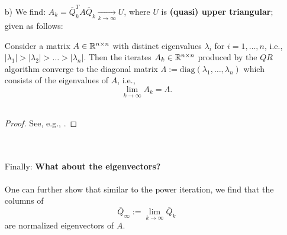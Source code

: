 \begin{frame}
\begin{itemize}
	\item[b)] We find: $A_{k} = \overline{Q}_k^T A\overline{Q}_k  \xrightarrow[k\to \infty]{} U$, where $U$ is {\color{codegreen}\textbf{(quasi) upper triangular}}; given as follows:
\begin{theorem}[$QR$ Algorithm]
Consider a matrix $A\in{\mathbb{R}}^{n\times n}$ with distinct eigenvalues $\lambda_i$ for $i=1,\ldots,n$, i.e.,
$
|\lambda_1|>|\lambda_2|>\ldots>|\lambda_n|
$. Then the iterates $A_k\in{\mathbb{R}}^{n\times n}$ produced by the $QR$ algorithm converge to the diagonal matrix $\Lambda := \text{diag}(\lambda_1, \ldots, \lambda_n)$ which consists of the eigenvalues of $A$, i.e., 
$$\lim_{k\to \infty} A_k = \Lambda. $$~\\
\end{theorem}
\begin{proof}
	See, e.g., \cite[Satz 7.8]{Rannacher}.
\end{proof}
~\\~\\
Finally: \textbf{What about the eigenvectors?}\\~\\
One can further show that similar to the power iteration, we find that the columns of $$\overline{Q}_\infty := \lim_{k\to \infty}\overline{Q}_k$$ are normalized eigenvectors of $A$.
\end{itemize}
\end{frame}


